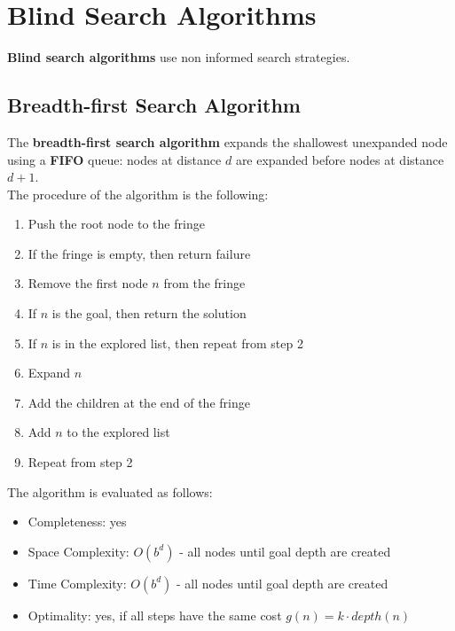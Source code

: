 \documentclass{article}
\begin{document}
\newpage

\section{Blind Search Algorithms}
\textbf{Blind search algorithms} use non informed search strategies.
\subsection{Breadth-first Search Algorithm}
The \textbf{breadth-first search algorithm} expands the shallowest unexpanded node using a \textbf{FIFO} queue: nodes at distance $d$ are expanded before nodes at distance $d + 1$. \\
The procedure of the algorithm is the following:
\begin{enumerate}
    \item Push the root node to the fringe
    \item If the fringe is empty, then return failure
    \item Remove the first node $n$ from the fringe
    \item If $n$ is the goal, then return the solution
    \item If $n$ is in the explored list, then repeat from step 2
    \item Expand $n$ 
    \item Add the children at the end of the fringe
    \item Add $n$ to the explored list
    \item Repeat from step 2
\end{enumerate}
\vspace{0.2cm}
The algorithm is evaluated as follows:
\begin{itemize}
    \item Completeness: yes
    \item Space Complexity: $O(b^d)$ - all nodes until goal depth are created  
    \item Time Complexity: $O(b^d)$ - all nodes until goal depth are created  
    \item Optimality: yes, if all steps have the same cost $g(n) = k \cdot depth(n)$
\end{itemize}
\newpage
\end{document}
